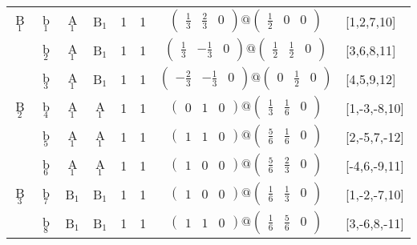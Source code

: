 \documentclass[fleqn,10pt,landscape]{article}
\begin{document}
\begin{itemize}
\begin{center}
\begin{longtable}{cc|cc|c|c|c|l}
B$_{1}$ & b$_{1}$ & A$_{1}$ & B$_{1}$ & 1 & 1 & $\begin{pmatrix} \frac{1}{3} & \frac{2}{3} & 0 \end{pmatrix}@\begin{pmatrix} \frac{1}{2} & 0 & 0 \end{pmatrix}$ & [1,2,7,10] \\
& b$_{2}$ & A$_{1}$ & B$_{1}$ & 1 & 1 & $\begin{pmatrix} \frac{1}{3} & - \frac{1}{3} & 0 \end{pmatrix}@\begin{pmatrix} \frac{1}{2} & \frac{1}{2} & 0 \end{pmatrix}$ & [3,6,8,11] \\
& b$_{3}$ & A$_{1}$ & B$_{1}$ & 1 & 1 & $\begin{pmatrix} - \frac{2}{3} & - \frac{1}{3} & 0 \end{pmatrix}@\begin{pmatrix} 0 & \frac{1}{2} & 0 \end{pmatrix}$ & [4,5,9,12] \\ \hline
B$_{2}$ & b$_{4}$ & A$_{1}$ & A$_{1}$ & 1 & 1 & $\begin{pmatrix} 0 & 1 & 0 \end{pmatrix}@\begin{pmatrix} \frac{1}{3} & \frac{1}{6} & 0 \end{pmatrix}$ & [1,-3,-8,10] \\
& b$_{5}$ & A$_{1}$ & A$_{1}$ & 1 & 1 & $\begin{pmatrix} 1 & 1 & 0 \end{pmatrix}@\begin{pmatrix} \frac{5}{6} & \frac{1}{6} & 0 \end{pmatrix}$ & [2,-5,7,-12] \\
& b$_{6}$ & A$_{1}$ & A$_{1}$ & 1 & 1 & $\begin{pmatrix} 1 & 0 & 0 \end{pmatrix}@\begin{pmatrix} \frac{5}{6} & \frac{2}{3} & 0 \end{pmatrix}$ & [-4,6,-9,11] \\ \hline
B$_{3}$ & b$_{7}$ & B$_{1}$ & B$_{1}$ & 1 & 1 & $\begin{pmatrix} 1 & 0 & 0 \end{pmatrix}@\begin{pmatrix} \frac{1}{6} & \frac{1}{3} & 0 \end{pmatrix}$ & [1,-2,-7,10] \\
& b$_{8}$ & B$_{1}$ & B$_{1}$ & 1 & 1 & $\begin{pmatrix} 1 & 1 & 0 \end{pmatrix}@\begin{pmatrix} \frac{1}{6} & \frac{5}{6} & 0 \end{pmatrix}$ & [3,-6,8,-11] \\

\end{longtable}
\end{center}
\end{itemize}
\end{document}

